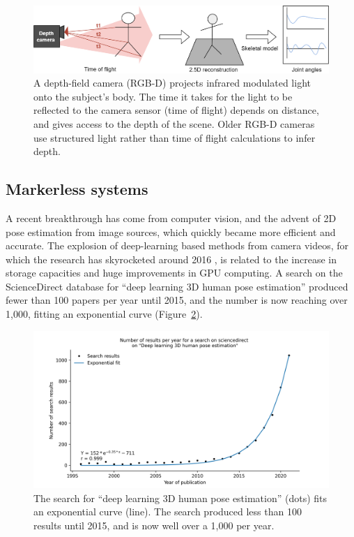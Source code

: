 \begin{figure}[hbtp]
	\centering
	\def\svgwidth{1\columnwidth}
	\fontsize{10pt}{10pt}\selectfont
	\includegraphics[width=\linewidth]{"../Chap1/Figures/Fig_Depth.png"}
	\caption{A depth-field camera (RGB-D) projects infrared modulated light onto the subject's body. The time it takes for the light to be reflected to the camera sensor (time of flight) depends on distance, and gives access to the depth of the scene.	Older RGB-D cameras use structured light rather than time of flight calculations to infer depth.}
	\label{fig_depth}
\end{figure}

\FloatBarrier
\subsection{Markerless systems}

A recent breakthrough has come from computer vision, and the advent of 2D pose estimation from image sources, which quickly became more efficient and accurate. The explosion of deep-learning based methods from camera videos, for which the research has skyrocketed around 2016 \cite{Wang2021a}, is related to the increase in storage capacities and huge improvements in GPU computing. A search on the ScienceDirect database for “deep learning 3D human pose estimation” produced fewer than 100 papers per year until 2015, and the number is now reaching over 1,000, fitting an exponential curve (Figure~\ref{fig_exp}).

\clearpage
\begin{figure}[hbtp]
	\centering
	\def\svgwidth{1\columnwidth}
	\fontsize{10pt}{10pt}\selectfont
	\includegraphics[width=\linewidth]{"../Chap1/Figures/Fig_Exp.png"}
	\caption{The search for “deep learning 3D human pose estimation” (dots) fits an exponential curve (line). The search produced less than 100 results until 2015, and is now well over a 1,000 per year.}
	\label{fig_exp}
\end{figure}

